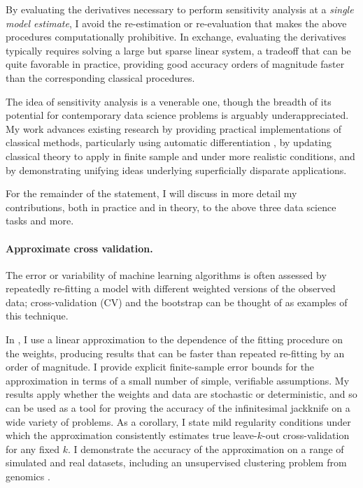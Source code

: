 By evaluating the derivatives necessary to perform sensitivity analysis at a
{\em single model estimate}, I avoid the re-estimation or re-evaluation that
makes the above procedures computationally prohibitive.  In exchange, evaluating
the derivatives typically requires solving a large but sparse linear system, a
tradeoff that can be quite favorable in practice, providing good accuracy orders
of magnitude faster than the corresponding classical procedures.

The idea of sensitivity analysis is a venerable one, though the breadth of its
potential for contemporary data science problems is arguably underappreciated.
My work advances existing research by providing practical implementations of
classical methods, particularly using automatic differentiation
\citep{baydin:2015:automatic}, by updating classical theory to apply in finite
sample and under more realistic conditions, and by demonstrating unifying ideas
underlying superficially disparate applications.

For the remainder of the statement, I will discuss in more detail my
contributions, both in practice and in theory, to the above three data science
tasks and more.


\newpage

\paragraph{Approximate cross validation.}

The error or variability of machine learning algorithms is often assessed by
repeatedly re-fitting a model with different weighted versions of the observed
data; cross-validation (CV) and the bootstrap can be thought of as examples of
this technique.

In \citet{giordano:2019:ij}, I use a linear approximation to the
dependence of the fitting procedure on the weights, producing results that can
be faster than repeated re-fitting by an order of magnitude. I provide explicit
finite-sample error bounds for the approximation in terms of a small number of
simple, verifiable assumptions.  My results apply whether the weights and data
are stochastic or deterministic, and so can be used as a tool for proving the
accuracy of the infinitesimal jackknife on a wide variety of problems. As a
corollary, I state mild regularity conditions under which the approximation
consistently estimates true leave-$k$-out cross-validation for any fixed $k$. I
demonstrate the accuracy of the approximation on a range of simulated and real
datasets, including an unsupervised clustering problem from genomics
\citep{Luan:2003:clustering, shoemaker:2015:ultrasensitive}.


